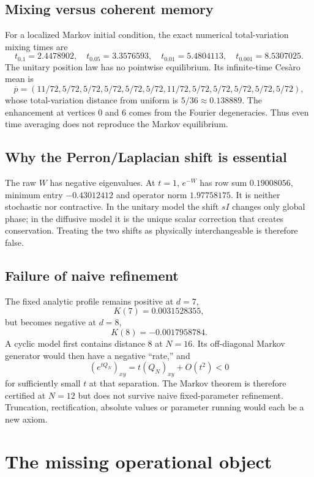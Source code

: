 \documentclass[11pt,a4paper]{article}
\theoremstyle{definition}
\theoremstyle{remark}
\begin{document}
\subsection{Mixing versus coherent memory}

For a localized Markov initial condition, the exact numerical total-variation mixing times are
\[
 t_{0.1}=2.4478902,\quad t_{0.05}=3.3576593,\quad
 t_{0.01}=5.4804113,\quad t_{0.001}=8.5307025.
\]
The unitary position law has no pointwise equilibrium. Its infinite-time Cesàro mean is
\[
 \overline p=(11/72,5/72,5/72,5/72,5/72,5/72,
 11/72,5/72,5/72,5/72,5/72,5/72),
\]
whose total-variation distance from uniform is $5/36\approx0.138889$. The enhancement at vertices $0$ and $6$ comes from the Fourier degeneracies. Thus even time averaging does not reproduce the Markov equilibrium.

\subsection{Why the Perron/Laplacian shift is essential}

The raw $W$ has negative eigenvalues. At $t=1$, $e^{-W}$ has row sum $0.19008056$, minimum entry $-0.43012412$ and operator norm $1.97758175$. It is neither stochastic nor contractive. In the unitary model the shift $sI$ changes only global phase; in the diffusive model it is the unique scalar correction that creates conservation. Treating the two shifts as physically interchangeable is therefore false.

\subsection{Failure of naive refinement}

The fixed analytic profile remains positive at $d=7$,
\[
 K(7)=0.0031528355,
\]
but becomes negative at $d=8$,
\[
 K(8)=-0.0017958784.
\]
A cyclic model first contains distance $8$ at $N=16$. Its off-diagonal Markov generator would then have a negative ``rate,'' and
\[
 (e^{tQ_N})_{xy}=t(Q_N)_{xy}+O(t^2)<0
\]
for sufficiently small $t$ at that separation. The Markov theorem is therefore certified at $N=12$ but does not survive naive fixed-parameter refinement. Truncation, rectification, absolute values or parameter running would each be a new axiom.

\section{The missing operational object}
\end{document}
